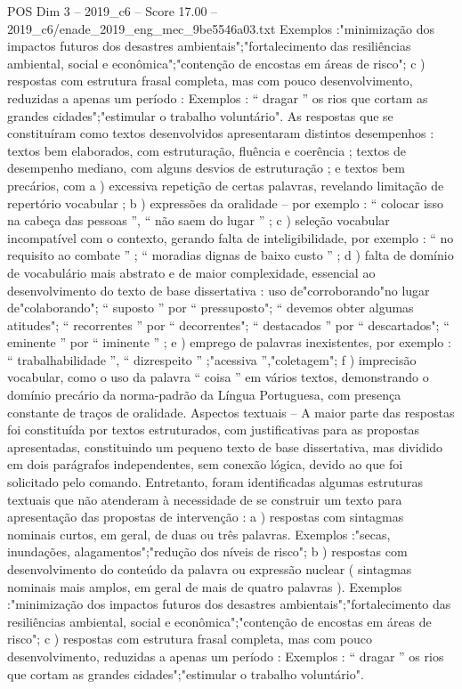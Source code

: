 \begin{textsample}{POS Dim 3 – 2019\_c6 – Score 17.00 – 2019\_c6/enade\_2019\_eng\_mec\_9be5546a03.txt}
Exemplos :"minimização dos impactos futuros dos desastres ambientais";"fortalecimento das resiliências ambiental, social e econômica";"contenção de encostas em áreas de risco"; c ) respostas com estrutura frasal completa, mas com pouco desenvolvimento, reduzidas a apenas um período : Exemplos : “ dragar ” os rios que cortam as grandes cidades";"estimular o trabalho voluntário".
As respostas que se constituíram como textos desenvolvidos apresentaram distintos desempenhos : textos bem elaborados, com estruturação, fluência e coerência ; textos de desempenho mediano, com alguns desvios de estruturação ; e textos bem precários, com a ) excessiva repetição de certas palavras, revelando limitação de repertório vocabular ; b ) expressões da oralidade – por exemplo : “ colocar isso na cabeça das pessoas ”, “ não saem do lugar ” ; c ) seleção vocabular incompatível com o contexto, gerando falta de inteligibilidade, por exemplo : “ no requisito ao combate ” ; “ moradias dignas de baixo custo ” ; d ) falta de domínio de vocabulário mais abstrato e de maior complexidade, essencial ao desenvolvimento do texto de base dissertativa : uso de"corroborando"no lugar de"colaborando"; “ suposto ” por “ pressuposto"; “ devemos obter algumas atitudes"; “ recorrentes ” por “ decorrentes"; “ destacados ” por “ descartados"; “ eminente ” por “ iminente ” ; e ) emprego de palavras inexistentes, por exemplo : “ trabalhabilidade ”, “ dizrespeito ” ;"acessiva ”,"coletagem"; f ) imprecisão vocabular, como o uso da palavra “ coisa ” em vários textos, demonstrando o domínio precário da norma-padrão da Língua Portuguesa, com presença constante de traços de oralidade.
Aspectos textuais – A maior parte das respostas foi constituída por textos estruturados, com justificativas para as propostas apresentadas, constituindo um pequeno texto de base dissertativa, mas dividido em dois parágrafos independentes, sem conexão lógica, devido ao que foi solicitado pelo comando.
Entretanto, foram identificadas algumas estruturas textuais que não atenderam à necessidade de se construir um texto para apresentação das propostas de intervenção : a ) respostas com sintagmas nominais curtos, em geral, de duas ou três palavras.
Exemplos :"secas, inundações, alagamentos";"redução dos níveis de risco"; b ) respostas com desenvolvimento do conteúdo da palavra ou expressão nuclear ( sintagmas nominais mais amplos, em geral de mais de quatro palavras ).
Exemplos :"minimização dos impactos futuros dos desastres ambientais";"fortalecimento das resiliências ambiental, social e econômica";"contenção de encostas em áreas de risco"; c ) respostas com estrutura frasal completa, mas com pouco desenvolvimento, reduzidas a apenas um período : Exemplos : “ dragar ” os rios que cortam as grandes cidades";"estimular o trabalho voluntário".

\end{textsample}
